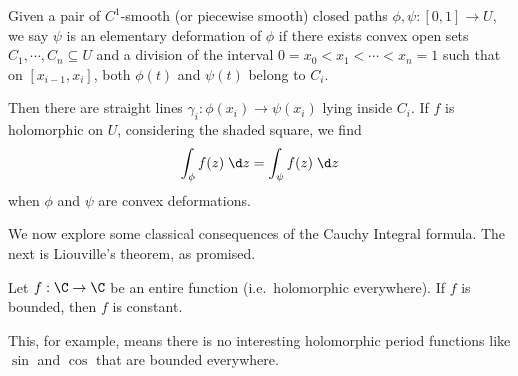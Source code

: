\documentclass[a4paper]{article}
\begin{document}
\begin{defi}
  Given a pair of $C^1$-smooth (or piecewise smooth) closed paths $\phi, \psi: [0, 1] \to U$, we say $\psi$ is an elementary deformation of $\phi$ if there exists convex open sets $C_1, \cdots, C_n \subseteq U$ and a division of the interval $0 = x_0 < x_1 < \cdots < x_n = 1$ such that on $[x_{i - 1}, x_i]$, both $\phi(t)$ and $\psi(t)$ belong to $C_i$.
\end{defi}
\begin{center}
\end{center}
Then there are straight lines $\gamma_i: \phi(x_i) \to \psi(x_i)$ lying inside $C_i$. If $f$ is holomorphic on $U$, considering the shaded square, we find
\[
  \int_\phi f(z)\;\d z = \int_\psi f(z)\;\d z
\]
when $\phi$ and $\psi$ are convex deformations.

We now explore some classical consequences of the Cauchy Integral formula. The next is Liouville's theorem, as promised.
\begin{thm}
  Let $f: \C \to \C$ be an entire function (i.e.\ holomorphic everywhere). If $f$ is bounded, then $f$ is constant.
\end{thm}
This, for example, means there is no interesting holomorphic period functions like $\sin$ and $\cos$ that are bounded everywhere.
\end{document}
